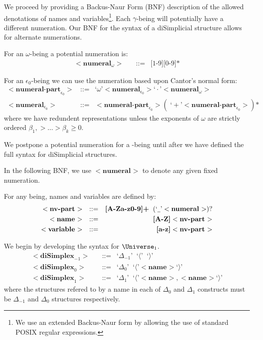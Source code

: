 \documentclass[a4paper,openany]{amsbook}
\begin{document}
We proceed by providing a Backus-Naur Form (BNF) description of the allowed
denotations of names and variables\footnote{We use an extended Backus-Naur form
by allowing the use of standard POSIX regular expressions.}. Each $\gamma$-being
will potentially have a different numeration. Our BNF for the syntax of a
diSimplicial structure allows for alternate numerations.

\newcommand{\bnf}[2]{\ensuremath{<\textbf{#1}_{#2}>}}
\newcommand{\bnfAssign}{\text{::=}}
\newcommand{\bnfT}[1]{\text{`}#1\text{'}}

For an $\omega$-being a potential numeration is:
%
\begin{align*}
%
\bnf{numeral}{\omega} \quad & \bnfAssign & \text{[1-9]}\text{[0-9]*}
%
\end{align*}
%

For an $\epsilon_0$-being we can use the numeration based upon Cantor's normal
form:
%
\begin{align*}
%
\bnf{numeral-part}{\epsilon_0} \quad & \bnfAssign & 
  \bnfT{\omega} \bnf{numeral}{\epsilon_0} \bnfT{\cdot} \bnf{numeral}{\omega} \\
%
\bnf{numeral}{\epsilon_0} \quad & \bnfAssign & 
  \bnf{numeral-part}{\epsilon_0} ( \; \bnfT{+} \bnf{numeral-part}{\epsilon_0} ) \text{*}
%
\end{align*}
%
where we have redundent representations unless the exponents of $\omega$ are
strictly ordered $\beta_1, > \ldots > \beta_k \ge 0$.

We postpone a potential numeration for a \Cardinal-being until after we have
defined the full syntax for diSimplicial structures.

In the following BNF, we use \bnf{numeral}{} to denote any given fixed
numeration.

For any being, names and variables are defined by:
%
\begin{align*}
%
\bnf{nv-part}{} \quad & \bnfAssign & 
  \textbf{[A-Za-z0-9]+} \;\; ( \bnfT{\underline{\hspace{1ex} }} \bnf{numeral}{} )\text{?} \\
%
\bnf{name}{} \quad & \bnfAssign & \textbf{[A-Z]} \bnf{nv-part}{} \\
%
\bnf{variable}{} \quad & \bnfAssign & \textbf{[a-z]} \bnf{nv-part}{}
%
\end{align*}

We begin by developing the syntax for $\Universe_1$.
%
\begin{align*}
%
\bnf{diSimplex}{-1} \quad & \bnfAssign & \bnfT{\Delta_{-1}} \;\; \bnfT{\langle} \;\; \bnfT{\rangle} \\
%
\bnf{diSimplex}{0} \quad & \bnfAssign & \bnfT{\Delta_0} \;\; \bnfT{\langle} \bnf{name}{} \bnfT{\rangle} \\
%
\bnf{diSimplex}{1} \quad & \bnfAssign & 
  \bnfT{\Delta_1} \;\; \bnfT{\langle} \bnf{name}{}, \bnf{name}{} \bnfT{\rangle}
%
\end{align*}
%
where the structures refered to by a name in each of $\Delta_0$ and $\Delta_1$
constructs must be $\Delta_{-1}$ and $\Delta_0$ structures respectively.
\end{document}

